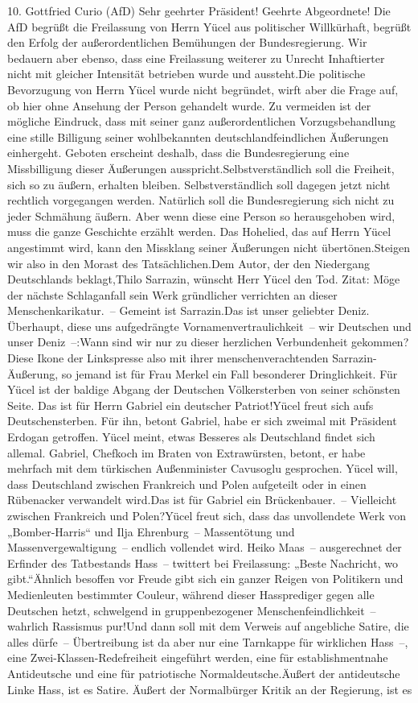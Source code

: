 \documentclass{article}
\begin{document}
	10. Gottfried Curio (AfD) Sehr geehrter Präsident! Geehrte Abgeordnete! Die AfD begrüßt die Freilassung von Herrn Yücel aus politischer Willkürhaft, begrüßt den Erfolg der außerordentlichen Bemühungen der Bundesregierung. Wir bedauern aber ebenso, dass eine Freilassung weiterer zu Unrecht Inhaftierter nicht mit gleicher Intensität betrieben wurde und aussteht.Die politische Bevorzugung von Herrn Yücel wurde nicht begründet, wirft aber die Frage auf, ob hier ohne Ansehung der Person gehandelt wurde. Zu vermeiden ist der mögliche Eindruck, dass mit seiner ganz außerordentlichen Vorzugsbehandlung eine stille Billigung seiner wohlbekannten deutschlandfeindlichen Äußerungen einhergeht. Geboten erscheint deshalb, dass die Bundesregierung eine Missbilligung dieser Äußerungen ausspricht.Selbstverständlich soll die Freiheit, sich so zu äußern, erhalten bleiben. Selbstverständlich soll dagegen jetzt nicht rechtlich vorgegangen werden. Natürlich soll die Bundesregierung sich nicht zu jeder Schmähung äußern. Aber wenn diese eine Person so herausgehoben wird, muss die ganze Geschichte erzählt werden. Das Hohelied, das auf Herrn Yücel angestimmt wird, kann den Missklang seiner Äußerungen nicht übertönen.Steigen wir also in den Morast des Tatsächlichen.Dem Autor, der den Niedergang Deutschlands beklagt,Thilo Sarrazin, wünscht Herr Yücel den Tod. Zitat: Möge der nächste Schlaganfall sein Werk gründlicher verrichten an dieser Menschenkarikatur. – Gemeint ist Sarrazin.Das ist unser geliebter Deniz. Überhaupt, diese uns aufgedrängte Vornamenvertraulichkeit – wir Deutschen und unser Deniz –:Wann sind wir nur zu dieser herzlichen Verbundenheit gekommen?Diese Ikone der Linkspresse also mit ihrer menschenverachtenden Sarrazin-Äußerung, so jemand ist für Frau Merkel ein Fall besonderer Dringlichkeit. Für Yücel ist der baldige Abgang der Deutschen Völkersterben von seiner schönsten Seite. Das ist für Herrn Gabriel ein deutscher Patriot!Yücel freut sich aufs Deutschensterben. Für ihn, betont Gabriel, habe er sich zweimal mit Präsident Erdogan getroffen. Yücel meint, etwas Besseres als Deutschland findet sich allemal. Gabriel, Chefkoch im Braten von Extrawürsten, betont, er habe mehrfach mit dem türkischen Außenminister Cavusoglu gesprochen. Yücel will, dass Deutschland zwischen Frankreich und Polen aufgeteilt oder in einen Rübenacker verwandelt wird.Das ist für Gabriel ein Brückenbauer. – Vielleicht zwischen Frankreich und Polen?Yücel freut sich, dass das unvollendete Werk von „Bomber-Harris“ und Ilja Ehrenburg – Massentötung und Massenvergewaltigung – endlich vollendet wird. Heiko Maas – ausgerechnet der Erfinder des Tatbestands Hass – twittert bei Freilassung: „Beste Nachricht, wo gibt.“Ähnlich besoffen vor Freude gibt sich ein ganzer Reigen von Politikern und Medienleuten bestimmter Couleur, während dieser Hassprediger gegen alle Deutschen hetzt, schwelgend in gruppenbezogener Menschenfeindlichkeit – wahrlich Rassismus pur!Und dann soll mit dem Verweis auf angebliche Satire, die alles dürfe – Übertreibung ist da aber nur eine Tarnkappe für wirklichen Hass –, eine Zwei-Klassen-Redefreiheit eingeführt werden, eine für establishmentnahe Antideutsche und eine für patriotische Normaldeutsche.Äußert der antideutsche Linke Hass, ist es Satire. Äußert der Normalbürger Kritik an der Regierung, ist es 
\end{document}
